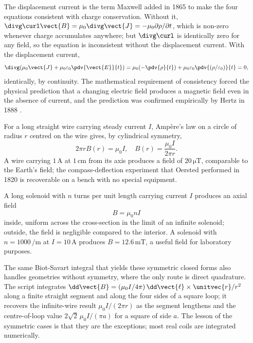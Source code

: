 The displacement current is the term Maxwell added in 1865 to make the
four equations consistent with charge conservation. Without it,
$\divg \curl \vect{B} = \mu_{0}\divg \vect{J} = -\mu_{0}\partial \rho/
\partial t$, which is non-zero whenever charge accumulates anywhere;
but $\divg \curl$ is identically zero for any field, so the equation
is inconsistent without the displacement current. With the
displacement current,
\[
\divg(\mu_{0}\vect{J} + \mu_{0}\varepsilon_{0}\pdv{\vect{E}}{t}) =
\mu_{0}(-\pdv{\rho}{t}) + \mu_{0}\varepsilon_{0}\pdv{(\rho/
\varepsilon_{0})}{t} = 0,
\]
identically, by continuity. The mathematical requirement of consistency
forced the physical prediction that a changing electric field produces
a magnetic field even in the absence of current, and the prediction
was confirmed empirically by Hertz in 1888 \cite{hist:hertz1893}.



For a long straight wire carrying steady current $I$, Amp\`ere's law on
a circle of radius $r$ centred on the wire gives, by cylindrical
symmetry,
\[
2\pi r B(r) = \mu_{0} I, \quad B(r) = \frac{\mu_{0} I}{2\pi r}.
\]
A wire carrying $1\,\si{\ampere}$ at $1\,\si{\centi\meter}$ from its
axis produces a field of $20\,\si{\micro\tesla}$, comparable to the
Earth's field; the compass-deflection experiment that Oersted
performed in 1820 is recoverable on a bench with no special equipment.

A long solenoid with $n$ turns per unit length carrying current $I$
produces an axial field
\[
B = \mu_{0} n I
\]
inside, uniform across the cross-section in the limit of an infinite
solenoid; outside, the field is negligible compared to the interior.
A solenoid with $n = 1000\,\si{\per\meter}$ at $I = 10\,\si{\ampere}$
produces $B = 12.6\,\si{\milli\tesla}$, a useful field for laboratory
purposes.



The same Biot-Savart integral that yields these symmetric closed forms
also handles geometries without symmetry, where the only route is direct
quadrature. The script  integrates
$\dd\vect{B} = (\mu_0 I/4\pi)\,\dd\vect{\ell}\times\unitvec{r}/r^{2}$
along a finite straight segment and along the four sides of a square
loop; it recovers the infinite-wire result $\mu_0 I/(2\pi r)$ as the
segment lengthens and the centre-of-loop value $2\sqrt{2}\,\mu_0 I/
(\pi a)$ for a square of side $a$. The lesson of the symmetric cases is
that they are the exceptions; most real coils are integrated
numerically.

